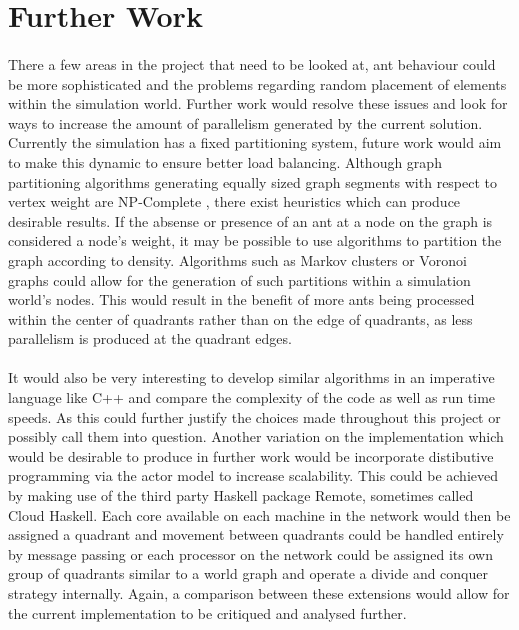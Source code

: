 \documentclass[main.tex]{subfiles}
\begin{document}

\section{Further Work}

\paragraph{}There a few areas in the project that need to be looked at, ant behaviour could be more sophisticated and the problems regarding random placement of elements within the simulation world. Further work would resolve these issues and look for ways to increase the amount of parallelism generated by the current solution. Currently the simulation has a fixed partitioning system, future work would aim to make this dynamic to ensure better load balancing. Although graph partitioning algorithms generating equally sized graph segments with respect to vertex weight are NP-Complete \cite{Skiena2010}, there exist heuristics which can produce desirable results. If the absense or presence of an ant at a node on the graph is considered a node's weight, it may be possible to use algorithms to partition the graph according to density. Algorithms such as Markov clusters or Voronoi graphs could allow for the generation of such partitions within a simulation world's nodes. This would result in the benefit of more ants being processed within the center of quadrants rather than on the edge of quadrants, as less parallelism is produced at the quadrant edges.

\paragraph{}It would also be very interesting to develop similar algorithms in an imperative language like C++ and compare the complexity of the code as well as run time speeds. As this could further justify the choices made throughout this project or possibly call them into question. Another variation on the implementation which would be desirable to produce in further work would be incorporate distibutive programming via the actor model to increase scalability. This could be achieved by making use of the third party Haskell package Remote, sometimes called Cloud Haskell. Each core available on each machine in the network would then be assigned a quadrant and movement between quadrants could be handled entirely by message passing or each processor on the network could be assigned its own group of quadrants similar to a world graph and operate a divide and conquer strategy internally. Again, a comparison between these extensions would allow for the current implementation to be critiqued and analysed further.
\end{document}
